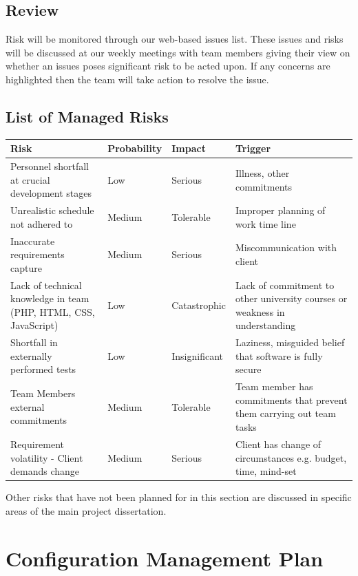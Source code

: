 \documentclass{l3proj}
\begin{document}
\subsection{Review}
Risk will be monitored through our web-based issues list. These issues and
risks will be discussed at our weekly meetings with team members giving their
view on whether an issues poses significant risk to be acted upon. If any
concerns are highlighted then the team will take action to resolve the issue.

\subsection{List of Managed Risks}

\begin{center}
    \begin{tabular}{ | p{4cm} | l | l | p{4cm} |}
    \hline
    Risk & Probability & Impact & Trigger \\ \hline
    Personnel shortfall at crucial development stages & Low & Serious & Illness, other commitments  \\ \hline
    Unrealistic schedule not adhered to & Medium & Tolerable & Improper planning of work time line \\ \hline
    Inaccurate requirements capture & Medium & Serious & Miscommunication with client \\ \hline
    Lack of technical knowledge in team (PHP, HTML, CSS, JavaScript) & Low & Catastrophic & Lack of commitment
    to other university courses or weakness in understanding \\ \hline
    Shortfall in externally performed tests & Low & Insignificant & Laziness, misguided belief that software is fully secure \\ \hline
    Team Members external commitments & Medium & Tolerable & Team member has commitments that prevent them carrying out team tasks \\ \hline
    Requirement volatility - Client demands change & Medium & Serious & Client has change of circumstances e.g. budget, time, mind-set \\ 
    \hline
    \end{tabular}
\end{center}

Other risks that have not been planned for in this section are discussed in specific areas of the main project dissertation.

\section{Configuration Management Plan}
\label{sect:conf-man}
\end{document}

